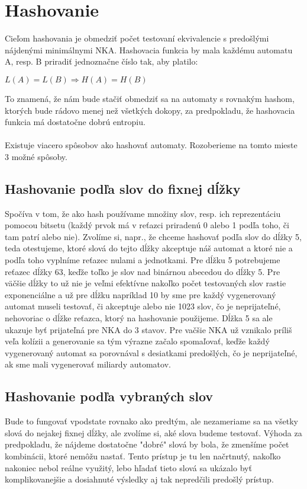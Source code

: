 \section{Hashovanie}
Cieľom hashovania je obmedziť počet testovaní ekvivalencie s predošlými nájdenými minimálnymi NKA. Hashovacia funkcia by mala každému automatu A, resp. B priradiť jednoznačne číslo tak, aby platilo:
\\
\centerline{$L(A) = L(B) \Rightarrow H(A) = H(B)$}
To znamená, že nám bude stačiť obmedziť sa na automaty s rovnakým hashom, ktorých bude rádovo menej než všetkých dokopy, za predpokladu, že hashovacia funkcia má dostatočne dobrú entropiu.

\paragraph{}
Existuje viacero spôsobov ako hashovať automaty. Rozoberieme na tomto mieste 3 možné spôsoby.


\label{hashSlova}
\subsection{Hashovanie podľa slov do fixnej dĺžky}
Spočíva v tom, že ako hash používame množiny slov, resp. ich reprezentáciu pomocou bitsetu (každý prvok má v reťazci priradenú 0 alebo 1 podľa toho, či tam patrí alebo nie). Zvolíme si, napr., že chceme hashovať podľa slov do dĺžky 5, teda otestujeme, ktoré slová do tejto dĺžky akceptuje náš automat a ktoré nie a podľa toho vyplníme reťazec nulami a jednotkami. Pre dĺžku 5 potrebujeme reťazec dĺžky 63, keďže toľko je slov nad binárnou abecedou do dĺžky 5. Pre väčšie dĺžky to už nie je veľmi efektívne nakoľko počet testovaných slov rastie exponenciálne a už pre dĺžku napríklad 10 by sme pre každý vygenerovaný automat museli testovať, či akceptuje alebo nie 1023 slov, čo je neprijateľné, nehovoriac o dĺžke reťazca, ktorý na hashovanie použijeme. Dĺžka 5 sa ale ukazuje byť prijateľná pre NKA do 3 stavov. Pre vačšie NKA už vznikalo príliš veľa kolízii a generovanie sa tým výrazne začalo spomaľovať, keďže každý vygenerovaný automat sa porovnával s desiatkami predošlých, čo je neprijateľné, ak sme mali vygenerovať miliardy automatov.

\subsection{Hashovanie podľa vybraných slov}
Bude to fungovať vpodstate rovnako ako predtým, ale nezameriame sa na všetky slová do nejakej fixnej dĺžky, ale zvolíme si, aké slova budeme testovať. Výhoda za predpokladu, že nájdeme dostatočne "dobré" slová by bola, že zmenšíme počet kombinácii, ktoré nemôžu nastať. Tento prístup je tu len načrtnutý, nakoľko nakoniec nebol reálne využitý, lebo hľadať tieto slová sa ukázalo byť komplikovanejšie a dosiahnuté výsledky aj tak nepredčili predošlý prístup.

